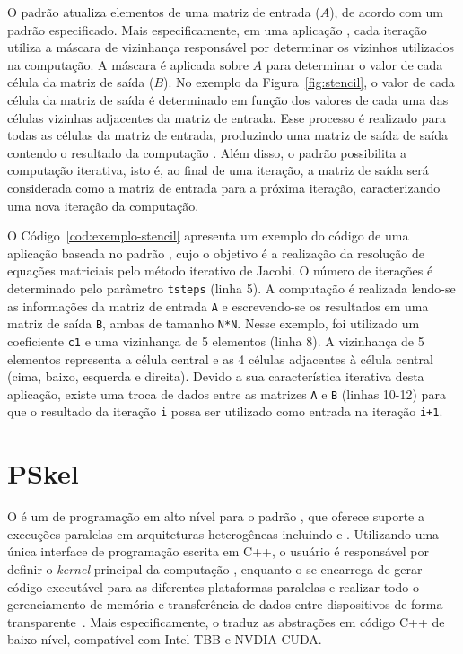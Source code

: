 O padrão \stencil atualiza elementos de uma matriz de entrada ($A$),
de acordo com um padrão especificado. Mais especificamente, em uma aplicação
\stencil, cada iteração utiliza a máscara de vizinhança responsável por determinar os vizinhos
utilizados na computação. A máscara é aplicada sobre $A$ para determinar o valor de cada
célula da matriz de saída ($B$). No exemplo da Figura~\ref{fig:stencil}, o
valor de cada célula da matriz de saída é determinado em função dos
valores de cada uma das células vizinhas adjacentes da matriz de entrada. Esse processo é realizado
para todas as células da matriz de entrada, produzindo uma matriz de saída
de saída contendo o resultado da computação \stencil. Além disso, o padrão possibilita a computação
iterativa, isto é, ao final de uma iteração, a matriz de saída será
considerada como a matriz de entrada para a próxima iteração,
caracterizando uma nova iteração da computação.

O Código~\ref{cod:exemplo-stencil} apresenta um exemplo do código de uma aplicação baseada no padrão
\stencil, cujo o objetivo é a realização da resolução de equações matriciais pelo método iterativo de Jacobi.
O número de iterações é determinado pelo parâmetro \texttt{tsteps} (linha 5). A computação
\stencil é realizada lendo-se as informações da matriz de entrada \texttt{A} e escrevendo-se os resultados em uma matriz de saída \texttt{B}, ambas de tamanho \texttt{N*N}.
Nesse exemplo, foi utilizado um coeficiente \texttt{c1} e uma vizinhança de 5 elementos (linha 8). A vizinhança de 5 elementos
representa a célula central e as 4 células adjacentes à célula central (cima, baixo, esquerda e direita).
Devido a sua característica iterativa desta aplicação, existe uma troca de dados entre as matrizes \texttt{A} e \texttt{B}
(linhas 10-12) para que o resultado da iteração \texttt{i} possa ser utilizado como entrada na iteração
\texttt{i+1}.


\section{PSkel}
\label{sec:pskel}

O \pskel é um \fw de programação em alto nível para o padrão \stencil, que
oferece suporte a execuções paralelas em arquiteturas heterogêneas incluindo \cpu
e \gpu. Utilizando uma única interface de programação escrita em C++, o usuário é
responsável por definir o \textit{kernel} principal da computação \stencil,
enquanto o \fw se encarrega de gerar código executável para as diferentes
plataformas paralelas e realizar todo o gerenciamento de memória e transferência
de dados entre dispositivos de forma transparente~\cite{pereira15}. Mais
especificamente, o \pskel traduz as abstrações em código C++ de baixo nível,
compatível com Intel TBB e NVDIA CUDA.

